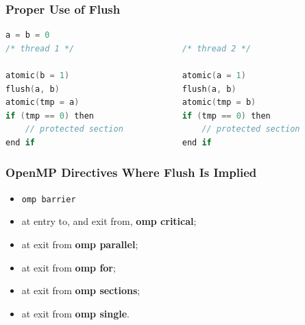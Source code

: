 \begin{frame}[fragile]
  \frametitle{Proper Use of Flush}

  \begin{lstlisting}[language=C,morekeywords={foreach,pragma,omp,parallel,single,nowait,task,untied,barrier,taskyield,mergeable,final,taskwait,critical}]
                    a = b = 0
/* thread 1 */                      /* thread 2 */

atomic(b = 1)                       atomic(a = 1)
flush(a, b)                         flush(a, b)
atomic(tmp = a)                     atomic(tmp = b)
if (tmp == 0) then                  if (tmp == 0) then
    // protected section                // protected section
end if                              end if
  \end{lstlisting}
\end{frame}

\begin{frame}
  \frametitle{OpenMP Directives Where Flush Is Implied}

\large
  \begin{itemize}
    \item {\tt omp barrier}
    \item at entry to, and exit from, {\bf omp critical};
    \item at exit from {\bf omp parallel}; 
    \item at exit from {\bf omp for};
    \item at exit from {\bf omp sections};
    \item at exit from {\bf omp single}.
  \end{itemize}

\end{frame}

